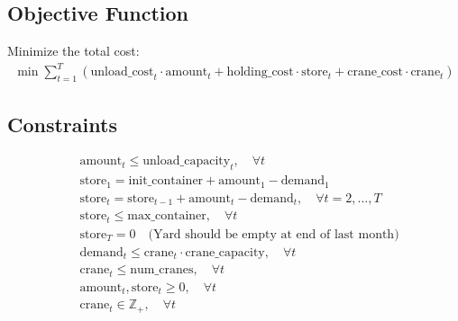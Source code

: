 \documentclass{article}
\begin{document}
\subsection*{Objective Function}
Minimize the total cost:
\begin{align*}
    \min \sum_{t=1}^{T} \left( \text{unload\_cost}_{t} \cdot \text{amount}_{t} + \text{holding\_cost} \cdot \text{store}_{t} + \text{crane\_cost} \cdot \text{crane}_{t} \right)
\end{align*}

\subsection*{Constraints}
\begin{align*}
    & \text{amount}_{t} \leq \text{unload\_capacity}_{t}, \quad \forall t \\
    & \text{store}_{1} = \text{init\_container} + \text{amount}_{1} - \text{demand}_{1} \\
    & \text{store}_{t} = \text{store}_{t-1} + \text{amount}_{t} - \text{demand}_{t}, \quad \forall t = 2, \ldots, T \\
    & \text{store}_{t} \leq \text{max\_container}, \quad \forall t \\
    & \text{store}_{T} = 0 \quad \text{(Yard should be empty at end of last month)} \\
    & \text{demand}_{t} \leq \text{crane}_{t} \cdot \text{crane\_capacity}, \quad \forall t \\
    & \text{crane}_{t} \leq \text{num\_cranes}, \quad \forall t \\
    & \text{amount}_{t}, \text{store}_{t} \geq 0, \quad \forall t \\
    & \text{crane}_{t} \in \mathbb{Z}_+, \quad \forall t
\end{align*}
\end{document}
